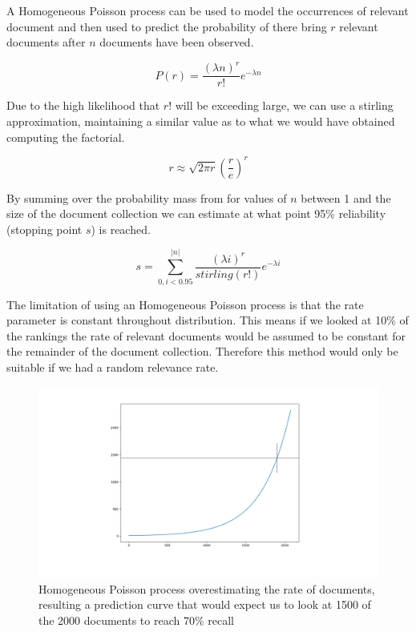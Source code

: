 A Homogeneous Poisson process can be used to model the occurrences of relevant document and then used to predict the probability of there bring $r$ relevant documents after $n$ documents have been observed. 

\begin{equation}
	  P(r) = \frac{(\lambda n)^r}{r!} e ^ {-\lambda n}
\end{equation}


Due to the high likelihood that $r!$ will be exceeding large, we can use a stirling approximation, maintaining a similar value as to what we would have obtained computing the factorial.

\begin{equation}
	   r \approx \sqrt{2\pi r} \left( \frac{r}{e} \right) ^r
\end{equation}

By summing over the probability mass from for values of $n$ between 1 and the size of the document collection we can estimate at what point 95\% reliability (stopping point $s$) is reached. 

\begin{equation}
	   s = \sum_{0, i < 0.95}^{|n|} \frac{(\lambda i)^r}{stirling(r!)} e ^ {-\lambda i}
\end{equation}

The limitation of using an Homogeneous Poisson process is that the rate parameter is constant throughout distribution. This means if we looked at 10\% of the rankings the rate of relevant documents would be assumed to be constant for the remainder of the document collection. Therefore this method would only be suitable if we had a random relevance rate.


\begin{figure}[H]
\center
\includegraphics[width=16cm]{figures/overestimate.png}
\caption{Homogeneous Poisson process overestimating the rate of documents, resulting a prediction curve that would expect us to look at 1500 of the 2000 documents to reach 70\% recall}
\end{figure}

